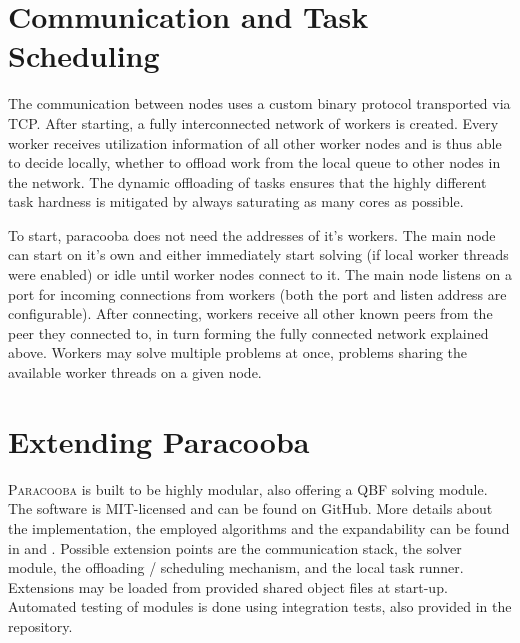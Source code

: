\documentclass[conference]{IEEEtran}
\newcommand{\paracooba}{\textsc{Paracooba}}
\begin{document}
\section{Communication and Task Scheduling}

The communication between nodes uses a custom binary protocol transported via
TCP. After starting, a fully interconnected network of workers is created.
Every worker receives utilization information of all other worker nodes and is
thus able to decide locally, whether to offload work from the local queue to
other nodes in the network. The dynamic offloading of tasks ensures that the
highly different task hardness is mitigated by always saturating as many cores
as possible.

To start, paracooba does not need the addresses of it's workers. The main node
can start on it's own and either immediately start solving (if local worker
threads were enabled) or idle until worker nodes connect to it. The main node
listens on a port for incoming connections from workers (both the port and
listen address are configurable). After connecting, workers receive all other
known peers from the peer they connected to, in turn forming the fully connected
network explained above.  Workers may solve multiple problems at once, problems
sharing the available worker threads on a given node.

\section{Extending Paracooba}

\paracooba{} is built to be highly modular, also offering a QBF solving module.
The software is MIT-licensed and can be found on GitHub. More details about the
implementation, the employed algorithms and the expandability can be found in
\cite{paracooba} and \cite{heisinger2021distributed}. Possible extension points
are the communication stack, the solver module, the offloading / scheduling
mechanism, and the local task runner. Extensions may be loaded from provided
shared object files at start-up. Automated testing of modules is done using
integration tests, also provided in the repository.
\end{document}
